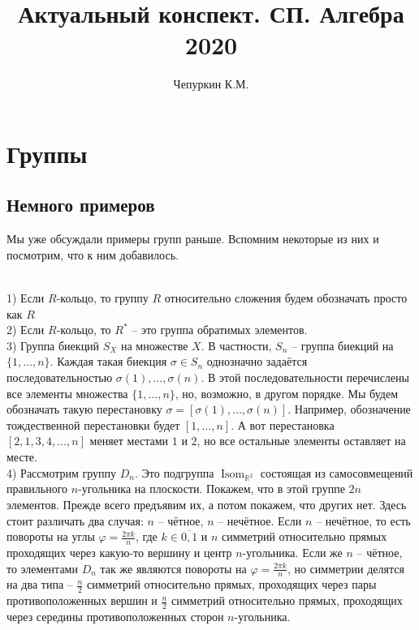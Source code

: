 \documentclass[10pt,a4paper,oneside]{book}
\title{Актуальный конспект. СП. Алгебра 2020}
\author{Чепуркин К.М.}
\date{}
\theoremstyle{definition}
\newcommand{\mb}[1]{\mathbb{#1}}
\newcommand{\ovl}{\overline}
\newcommand{\Isom}{\operatorname{Isom}}
\def\exm{\noindent {\bf Примеры:}}
\def\ffi{\varphi}
\begin{document}

\tableofcontents

\setcounter{chapter}{5}
\chapter{Группы}

\section{Немного примеров}

Мы уже обсуждали примеры групп раньше. Вспомним некоторые из них  и посмотрим, что к ним добавилось.

\exm \\
1) Если $R$-кольцо, то группу $R$ относительно сложения будем обозначать просто как $R$\\
2) Если $R$-кольцо, то $R^*$ -- это группа обратимых элементов.\\
3) Группа биекций $S_X$ на множестве $X$. В частности, $S_n$ -- группа биекций на $\{1,\dots,n\}$. Каждая такая биекция $\sigma \in  S_n$ однозначно задаётся последовательностью $\sigma(1),\dots,\sigma(n)$. В этой последовательности перечислены все элементы множества $\{1,\dots,n\}$, но, возможно, в другом порядке. Мы будем обозначать такую перестановку $\sigma=[\sigma(1),\dots,\sigma(n)]$. Например, обозначение тождественной перестановки будет $[1,\dots,n]$. А вот перестановка $[2,1,3,4,\dots,n]$ меняет местами $1$ и $2$, но все остальные элементы оставляет на месте.\\ 
4) Рассмотрим группу $D_n$. Это подгруппа $\Isom_{\mb R^2}$ состоящая из самосовмещений правильного $n$-угольника на плоскости. Покажем, что в этой группе $2n$ элементов. Прежде всего предъявим их, а потом покажем, что других нет. Здесь стоит различать два случая: $n$ -- чётное, $n$ -- нечётное. Если $n$ -- нечётное, то есть повороты на углы $\ffi=\frac{2\pi k}{n}$, где $k\in \ovl{0,1}$ и $n$ симметрий относительно прямых проходящих через какую-то вершину и центр $n$-угольника. Если же $n$ -- чётное, то элементами $D_n$ так же являются повороты на  $\ffi=\frac{2\pi k}{n}$, но симметрии делятся на два типа -- $\frac{n}{2}$ симметрий относительно прямых, проходящих через пары противоположенных вершин и $\frac{n}{2}$ симметрий относительно прямых, проходящих через середины противоположенных сторон $n$-угольника.
\end{document}

